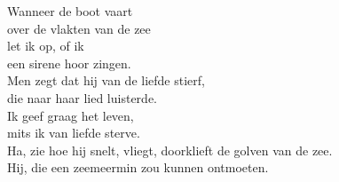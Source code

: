 \begin{translation}
Wanneer de boot vaart\\
over de vlakten van de zee\\
let ik op, of ik\\
een sirene hoor zingen.\\
Men zegt dat hij van de liefde stierf,\\
die naar haar lied luisterde.\\
Ik geef graag het leven,\\
mits ik van liefde sterve.\\
Ha, zie hoe hij snelt, vliegt, doorklieft de golven van de zee.\\
Hij, die een zeemeermin zou kunnen ontmoeten.\\
\end{translation}